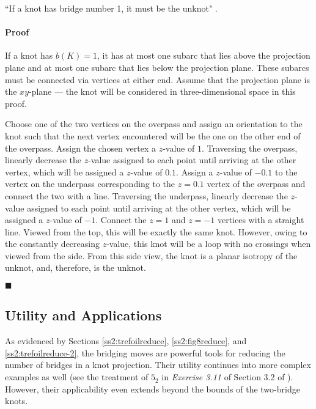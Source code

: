\documentclass[titlepage]{article}
\newcommand{\dq}[4][]{``#2"#1 \cite[#4]{#3}.}
\newcommand{\qed}{
    \begin{flushright}
        $\blacksquare$
    \end{flushright}
}
\begin{document}
\begin{theor}
    \dq{If a knot has bridge number 1, it must be the unknot}{bib:knotbook}{65}
\end{theor}

\paragraph{Proof} If a knot has $b(K)=1$, it has at most one subarc that lies above the projection plane and at most one subarc that lies below the projection plane. These subarcs must be connected via vertices at either end. Assume that the projection plane is the $xy$-plane --- the knot will be considered in three-dimensional space in this proof.\par
Choose one of the two vertices on the overpass and assign an orientation to the knot such that the next vertex encountered will be the one on the other end of the overpass. Assign the chosen vertex a $z$-value of $1$. Traversing the overpass, linearly decrease the $z$-value assigned to each point until arriving at the other vertex, which will be assigned a $z$-value of $0.1$. Assign a $z$-value of $-0.1$ to the vertex on the underpass corresponding to the $z=0.1$ vertex of the overpass and connect the two with a line. Traversing the underpass, linearly decrease the $z$-value assigned to each point until arriving at the other vertex, which will be assigned a $z$-value of $-1$. Connect the $z=1$ and $z=-1$ vertices with a straight line. Viewed from the top, this will be exactly the same knot. However, owing to the constantly decreasing $z$-value, this knot will be a loop with no crossings when viewed from the side. From this side view, the knot is a planar isotropy of the unknot, and, therefore, is the unknot.
\qed


\subsection{Utility and Applications}\label{sss:utility}
As evidenced by Sections \ref{ss2:trefoilreduce}, \ref{ss2:fig8reduce}, and \ref{ss2:trefoilreduce-2}, the bridging moves are powerful tools for reducing the number of bridges in a knot projection. Their utility continues into more complex examples as well (see the treatment of $5_2$ in \emph{Exercise 3.11} of Section 3.2 of \cite{bib:knotnotes}). However, their applicability even extends beyond the bounds of the two-bridge knots.\par
\end{document}
